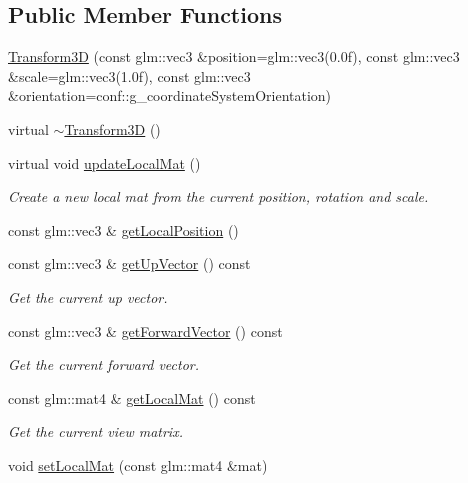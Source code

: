 \subsection*{Public Member Functions}
\begin{DoxyCompactItemize}
\item 
\mbox{\hyperlink{classec_1_1_transform3_d_adb5c661621922b1a3a6e6433ce1c79f6}{Transform3D}} (const glm\+::vec3 \&position=glm\+::vec3(0.\+0f), const glm\+::vec3 \&scale=glm\+::vec3(1.\+0f), const glm\+::vec3 \&orientation=conf\+::g\+\_\+coordinate\+System\+Orientation)
\item 
virtual \mbox{\hyperlink{classec_1_1_transform3_d_a1df4b7afcf78aef64719b2302cfac864}{$\sim$\+Transform3D}} ()
\item 
virtual void \mbox{\hyperlink{classec_1_1_transform3_d_a68d259da063ea2aff48720ae55870445}{update\+Local\+Mat}} ()
\begin{DoxyCompactList}\small\item\em Create a new local mat from the current position, rotation and scale. \end{DoxyCompactList}\item 
const glm\+::vec3 \& \mbox{\hyperlink{classec_1_1_transform3_d_a69ce5285f9481b5615c084b9f892fdb8}{get\+Local\+Position}} ()
\item 
const glm\+::vec3 \& \mbox{\hyperlink{classec_1_1_transform3_d_af8bdfb3bbc688a9a920ccb4d452d8962}{get\+Up\+Vector}} () const
\begin{DoxyCompactList}\small\item\em Get the current up vector. \end{DoxyCompactList}\item 
const glm\+::vec3 \& \mbox{\hyperlink{classec_1_1_transform3_d_afc4f5c1122a5191ad2a4628a43a76a7c}{get\+Forward\+Vector}} () const
\begin{DoxyCompactList}\small\item\em Get the current forward vector. \end{DoxyCompactList}\item 
const glm\+::mat4 \& \mbox{\hyperlink{classec_1_1_transform3_d_a8aa0ac4df795971dad499a0d12348d07}{get\+Local\+Mat}} () const
\begin{DoxyCompactList}\small\item\em Get the current view matrix. \end{DoxyCompactList}\item 
void \mbox{\hyperlink{classec_1_1_transform3_d_a5cc1409f0c09910a701dcd294e797498}{set\+Local\+Mat}} (const glm\+::mat4 \&mat)

\end{DoxyCompactItemize}
